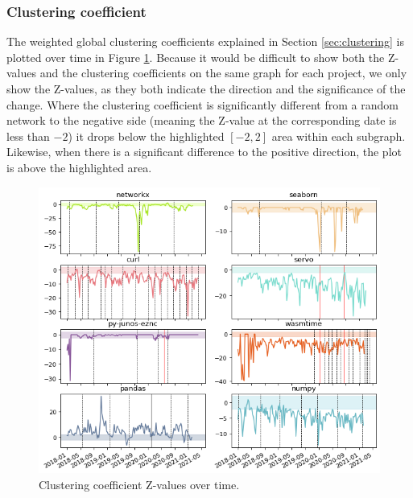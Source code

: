 \subsubsection{Clustering coefficient}

The weighted global clustering coefficients explained in Section \ref{sec:clustering} is plotted over time in Figure \ref{fig:clust}. Because it would be difficult to show both the Z-values and the clustering coefficients on the same graph for each project, we only show the Z-values, as they both indicate the direction and the significance of the change. Where the clustering coefficient is significantly different from a random network to the negative side (meaning the Z-value at the corresponding date is less than $-2$) it drops below the highlighted $[-2, 2]$ area within each subgraph. Likewise, when there is a significant difference to the positive direction, the plot is above the highlighted area.

\begin{figure}[!htbp]
    \centering
    \includegraphics[width=\textwidth]{figures/qualitative/clustering_coeff/clustering_z.png}
    \caption{Clustering coefficient Z-values over time.}
    \label{fig:clust}
\end{figure}

